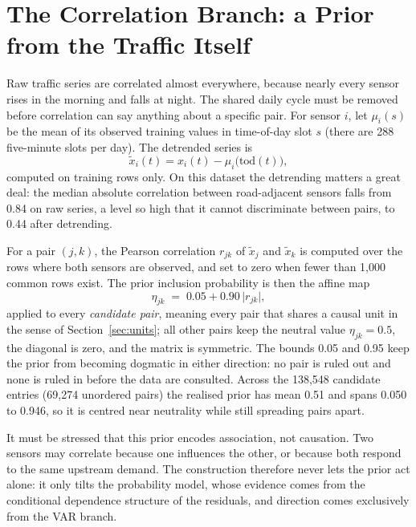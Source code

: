 \documentclass[MTech]{ugthesis}
\begin{document}
\section{The Correlation Branch: a Prior from the Traffic Itself}
\label{sec:prior}

Raw traffic series are correlated almost everywhere, because nearly every sensor rises in the morning and falls at night. The shared daily cycle must be removed before correlation can say anything about a specific pair. For sensor $i$, let $\mu_i(s)$ be the mean of its observed training values in time-of-day slot $s$ (there are 288 five-minute slots per day). The detrended series is
\begin{equation}
\tilde{x}_i(t) = x_i(t) - \mu_i\big(\mathrm{tod}(t)\big),
\label{eq:detrend}
\end{equation}
computed on training rows only. On this dataset the detrending matters a great deal: the median absolute correlation between road-adjacent sensors falls from 0.84 on raw series, a level so high that it cannot discriminate between pairs, to 0.44 after detrending.

For a pair $(j,k)$, the Pearson correlation $r_{jk}$ of $\tilde{x}_j$ and $\tilde{x}_k$ is computed over the rows where both sensors are observed, and set to zero when fewer than 1,000 common rows exist. The prior inclusion probability is then the affine map
\begin{equation}
\eta_{jk} \;=\; 0.05 + 0.90\,\lvert r_{jk}\rvert ,
\label{eq:eta}
\end{equation}
applied to every \emph{candidate pair}, meaning every pair that shares a causal unit in the sense of Section~\ref{sec:units}; all other pairs keep the neutral value $\eta_{jk}=0.5$, the diagonal is zero, and the matrix is symmetric. The bounds 0.05 and 0.95 keep the prior from becoming dogmatic in either direction: no pair is ruled out and none is ruled in before the data are consulted. Across the 138,548 candidate entries (69,274 unordered pairs) the realised prior has mean 0.51 and spans 0.050 to 0.946, so it is centred near neutrality while still spreading pairs apart.

It must be stressed that this prior encodes association, not causation. Two sensors may correlate because one influences the other, or because both respond to the same upstream demand. The construction therefore never lets the prior act alone: it only tilts the probability model, whose evidence comes from the conditional dependence structure of the residuals, and direction comes exclusively from the VAR branch.
\end{document}
